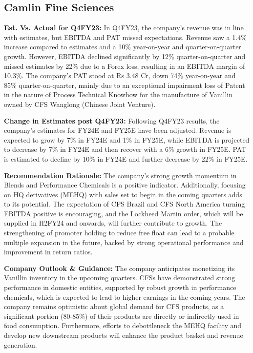 \subsection{Camlin Fine Sciences}

\textbf{Est. Vs. Actual for Q4FY23:}
In Q4FY23, the company's revenue was in line with estimates, but EBITDA and PAT missed expectations. Revenue saw a 1.4\% increase compared to estimates and a 10\% year-on-year and quarter-on-quarter growth. However, EBITDA declined significantly by 12\% quarter-on-quarter and missed estimates by 22\% due to a Forex loss, resulting in an EBITDA margin of 10.3\%. The company's PAT stood at Rs 3.48 Cr, down 74\% year-on-year and 85\% quarter-on-quarter, mainly due to an exceptional impairment loss of Patent in the nature of Process Technical Knowhow for the manufacture of Vanillin owned by CFS Wanglong (Chinese Joint Venture).

\textbf{Change in Estimates post Q4FY23:}
Following Q4FY23 results, the company's estimates for FY24E and FY25E have been adjusted. Revenue is expected to grow by 7\% in FY24E and 1\% in FY25E, while EBITDA is projected to decrease by 7\% in FY24E and then recover with a 6\% growth in FY25E. PAT is estimated to decline by 10\% in FY24E and further decrease by 22\% in FY25E.

\textbf{Recommendation Rationale:}
The company's strong growth momentum in Blends and Performance Chemicals is a positive indicator. Additionally, focusing on HQ derivatives (MEHQ) with sales set to begin in the coming quarters adds to its potential. The expectation of CFS Brazil and CFS North America turning EBITDA positive is encouraging, and the Lockheed Martin order, which will be supplied in H2FY24 and onwards, will further contribute to growth. The strengthening of promoter holding to reduce free float can lead to a probable multiple expansion in the future, backed by strong operational performance and improvement in return ratios.

\textbf{Company Outlook \& Guidance:}
The company anticipates monetizing its Vanillin inventory in the upcoming quarters. CFSs have demonstrated strong performance in domestic entities, supported by robust growth in performance chemicals, which is expected to lead to higher earnings in the coming years. The company remains optimistic about global demand for CFS products, as a significant portion (80-85\%) of their products are directly or indirectly used in food consumption. Furthermore, efforts to debottleneck the MEHQ facility and develop new downstream products will enhance the product basket and revenue generation.

